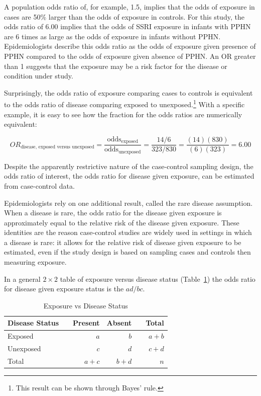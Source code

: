 A population odds ratio of, for example, 1.5, implies that the odds of exposure in cases are 50\% larger than the odds of exposure in controls. For this study, the odds ratio of 6.00 implies that the odds of SSRI exposure in infants with PPHN are 6 times as large as the odds of exposure in infants without PPHN. Epidemiologists describe this odds ratio as the odds of exposure given presence of PPHN compared to the odds of exposure given absence of PPHN. An OR greater than 1 suggests that the exposure may be a risk factor for the disease or condition under study.

Surprisingly, the odds ratio of exposure comparing cases to controls is equivalent to the odds ratio of disease comparing exposed to unexposed.\footnote{This result can be shown through Bayes' rule.} With a specific example, it is easy to see how the fraction for the odds ratios are numerically equivalent:

\[OR_{\text{disease, exposed versus unexposed}} = \frac{\text{odds$_\text{exposed}$}}{\text{odds$_\text{unexposed}$}} = \frac{14/6}{323/830} = \frac{(14)(830)}{(6)(323)} = 6.00 \]

Despite the apparently restrictive nature of the case-control sampling design, the odds ratio of interest, the odds ratio for disease given exposure, can be estimated from case-control data.

Epidemiologists rely on one additional result, called the rare disease assumption. When a disease is rare, the odds ratio for the disease given exposure is approximately equal to the relative risk of the disease given exposure.  These identities are the reason case-control studies are widely used in settings in which a disease is rare: it allows for the relative risk of disease given exposure to be estimated, even if the study design is based on sampling cases and controls then measuring exposure.

In a general $2 \times 2$ table of exposure versus disease status (Table~\ref{generalTwoByTwoTable}) the odds ratio for disease given exposure status is the $ad/bc$.
 \begin{table}[h]
	\centering
	\begin{tabular}{ll rrr r}
		\hline
		Disease Status  & \hspace{2mm} & Present & Absent & \hspace{2mm} & Total \\
		\hline
		Exposed &	& $a$ & $b$ &  & $a + b$  \\
		Unexposed & & $c$ & $d$ &  & $c + d $  \\
        Total & & $a + c$ & $b + d$ & & $n$ \\
		\hline
	\end{tabular}
    \caption{Exposure vs Disease Status}
    \label{generalTwoByTwoTable}
\end{table}	

